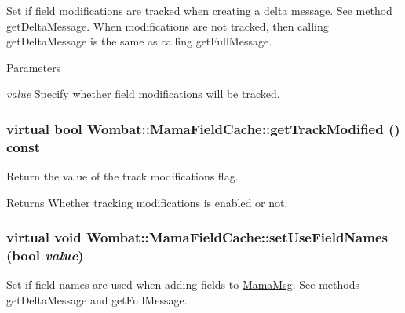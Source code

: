 Set if field modifications are tracked when creating a delta message. See method {\ttfamily getDeltaMessage}. When modifications are not tracked, then calling {\ttfamily getDeltaMessage} is the same as calling {\ttfamily getFullMessage}.


\begin{DoxyParams}{Parameters}
\item[{\em value}]Specify whether field modifications will be tracked. \end{DoxyParams}
\hypertarget{classWombat_1_1MamaFieldCache_a8dbe545195a5232d3850970ec78077e5}{
\subsubsection[{getTrackModified}]{\setlength{\rightskip}{0pt plus 5cm}virtual bool Wombat::MamaFieldCache::getTrackModified () const}}
\label{classWombat_1_1MamaFieldCache_a8dbe545195a5232d3850970ec78077e5}


Return the value of the track modifications flag. \begin{DoxyReturn}{Returns}
Whether tracking modifications is enabled or not. 
\end{DoxyReturn}
\hypertarget{classWombat_1_1MamaFieldCache_a3df35f467c5a3fa970a4dd216a9ac844}{
\subsubsection[{setUseFieldNames}]{\setlength{\rightskip}{0pt plus 5cm}virtual void Wombat::MamaFieldCache::setUseFieldNames (bool {\em value})}}
\label{classWombat_1_1MamaFieldCache_a3df35f467c5a3fa970a4dd216a9ac844}


Set if field names are used when adding fields to \hyperlink{classWombat_1_1MamaMsg}{MamaMsg}. See methods {\ttfamily getDeltaMessage} and {\ttfamily getFullMessage}.


